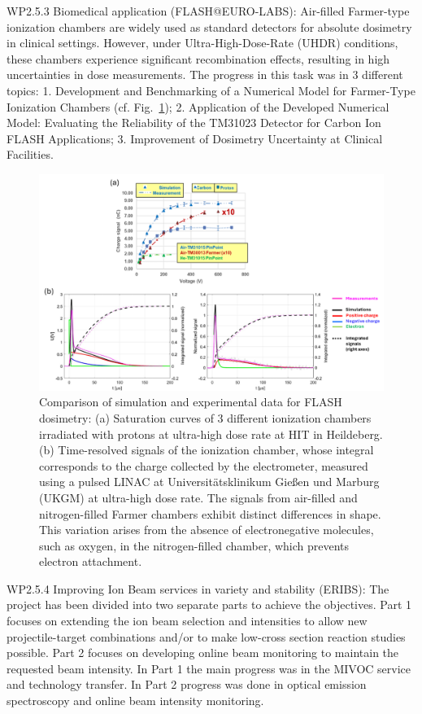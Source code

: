 WP2.5.3 Biomedical application (FLASH@EURO-LABS): Air-filled Farmer-type ionization chambers are widely used as standard detectors for absolute dosimetry in clinical settings. However, under Ultra-High-Dose-Rate (UHDR) conditions, these chambers experience significant recombination effects, resulting in high uncertainties in dose measurements.
The progress in this task was in 3 different topics: 1. Development and Benchmarking of a Numerical Model for Farmer-Type Ionization Chambers (cf. Fig.~\ref{fig:FLASH1}); 2. Application of the Developed Numerical Model: Evaluating the Reliability of the TM31023 Detector for Carbon Ion FLASH Applications; 3. Improvement of Dosimetry Uncertainty at Clinical Facilities.

\begin{figure}[!h]
    \centering
    \includegraphics[width=1.0\linewidth]{graphics/FLASH1.png}
    \caption{Comparison of simulation and experimental data for FLASH dosimetry:
(a) Saturation curves of 3 different ionization chambers irradiated with protons at ultra-high dose rate at HIT in Heildeberg. (b) Time-resolved signals of the ionization chamber, whose integral corresponds to the charge collected by the electrometer, measured using a pulsed LINAC at Universitätsklinikum Gießen und Marburg (UKGM) at ultra-high dose rate. The signals from air-filled and nitrogen-filled Farmer chambers exhibit distinct differences in shape. This variation arises from the absence of electronegative molecules, such as oxygen, in the nitrogen-filled chamber, which prevents electron attachment.
}
    \label{fig:FLASH1}
\end{figure}

WP2.5.4 Improving Ion Beam services in variety and stability (ERIBS): The project has been divided into two separate parts to achieve the objectives. Part 1 focuses on extending the ion beam selection and intensities to allow new projectile-target combinations and/or to make low-cross section reaction studies possible. Part 2 focuses on developing online beam monitoring to maintain the requested beam intensity. In Part 1 the main progress was in the MIVOC service and technology transfer. In Part 2 progress was done in optical emission spectroscopy and online beam intensity monitoring.

